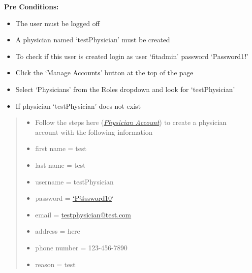 \documentclass[letterpaper,10pt,english]{sphinxmanual}
\begin{document}
\textbf{Pre Conditions:}
\begin{itemize}
\item {} 
The user must be logged off

\item {} 
A physician named `testPhysician' must be created

\end{itemize}
\begin{itemize}
\item {} 
To check if this user is created login as user `fitadmin' password `Password1!'

\item {} 
Click the `Manage Accounts' button at the top of the page

\item {} 
Select `Physicians' from the Roles dropdown and look for `testPhysician'

\end{itemize}
\begin{itemize}
\item {} 
If physician `testPhysician' does not exist

\end{itemize}
\begin{quote}
\begin{itemize}
\item {} 
Follow the steps here ({\hyperref[user_guide/account_creation:create-physician-account]{\emph{Physician Account}}}) to create a physician account with the following information

\end{itemize}
\begin{itemize}
\item {} 
first name = test

\item {} 
last name = test

\item {} 
username = testPhysician

\item {} 
password = \href{mailto:'P@ssword10}{`P@ssword10}`

\item {} 
email = \href{mailto:testphysician@test.com}{testphysician@test.com}

\item {} 
address = here

\item {} 
phone number = 123-456-7890

\item {} 
reason = test

\end{itemize}
\end{quote}
\end{document}
